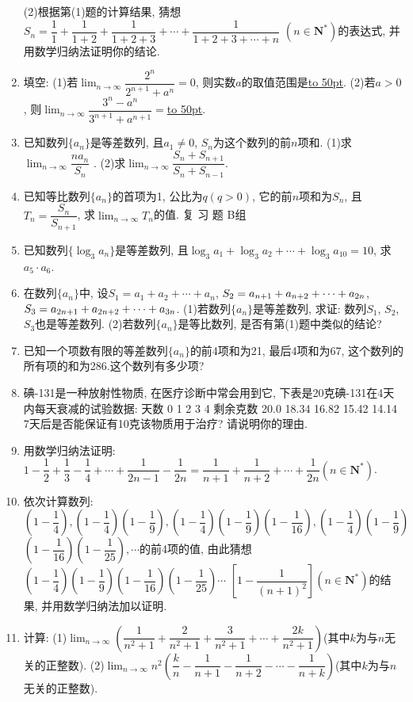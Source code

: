 \documentclass[10pt,a4paper]{article}
\newcommand{\blank}[1]{\underline{\hbox to #1pt{}}}
\begin{document}
\begin{enumerate}[1.]
(2)根据第(1)题的计算结果, 猜想$S_n=\dfrac 11+\dfrac 1{1+2}+\dfrac 1{1+2+3}+\cdots +\dfrac 1{1+2+3+\cdots +n}$ $(n\in \mathbf{N}^*)$的表达式, 并用数学归纳法证明你的结论.
\item 填空:
(1)若$\displaystyle\lim_{n\to\infty}\dfrac{2^n}{{2^{n+1}}+{a^n}}=0$, 则实数$a$的取值范围是\blank{50}.
(2)若$a>0$, 则$\displaystyle\lim_{n\to\infty}\dfrac{{3^n}-{a^n}}{{3^{n+1}}+{a^{n+1}}}=$\blank{50}.
\item 已知数列$\{a_n\}$是等差数列, 且$a_1\ne 0$, $S_n$为这个数列的前$n$项和.
(1)求$\displaystyle\lim_{n\to\infty}\dfrac{n{a_n}}{S_n}$ .
(2)求$\displaystyle\lim_{n\to\infty}\dfrac{{S_n}+{S_{n+1}}}{{S_n}+{S_{n-1}}}$.
\item 已知等比数列$\{a_n\}$的首项为1, 公比为$q(q>0)$, 它的前$n$项和为$S_n$, 且$T_n=\dfrac{S_n}{{S_{n+1}}}$, 求$\displaystyle\lim_{n\to\infty}T_n$的值.
复 习 题
B组
\item 已知数列$\{\log _3a_n\}$是等差数列, 且$\log _3a_1+\log _3a_2+\cdots +\log _3a_{10}=10$, 求$a_5\cdot a_6$.
\item 在数列$\{a_n\}$中, 设$S_1=a_1+a_2+\cdots +a_n$, $S_{\text2}=a_{n+1}+a_{n+2}+\cdots +a_{2n}$, $S_{\text3}=a_{2n+1}+a_{2n+2}+\cdots +a_{3n}$.
(1)若数列$\{a_n\}$是等差数列, 求证: 数列$S_1$, $S_2$, $S_3$也是等差数列.
(2)若数列$\{a_n\}$是等比数列, 是否有第(1)题中类似的结论?
\item 已知一个项数有限的等差数列$\{a_n\}$的前4项和为21, 最后4项和为67, 这个数列的所有项的和为286.这个数列有多少项?
\item 碘-131是一种放射性物质, 在医疗诊断中常会用到它, 下表是20克碘-131在4天内每天衰减的试验数据:
天数	0	1	2	3	4
剩余克数	20.0	18.34	16.82	15.42	14.14
7天后是否能保证有10克该物质用于治疗? 请说明你的理由.
\item 用数学归纳法证明:
$1-\dfrac 12+\dfrac 13-\dfrac 14+\cdots +\dfrac 1{2n-1}-\dfrac 1{2n}=\dfrac 1{n+1}+\dfrac 1{n+2}+\cdots +\dfrac 1{2n}(n\in \mathbf{N}^*)$.
\item 依次计算数列: $(1-\dfrac 14),(1-\dfrac 14)(1-\dfrac 19),(1-\dfrac 14)(1-\dfrac 19)(1-\dfrac 1{16}),(1-\dfrac 14)(1-\dfrac 19)$ $(1-\dfrac 1{16})(1-\dfrac 1{25}),\cdots$的前4项的值, 由此猜想$(1-\dfrac 14)(1-\dfrac 19)(1-\dfrac 1{16})(1-\dfrac 1{25})\cdots$ $[1-\dfrac 1{(n+1)^2}](n\in \mathbf{N}^*)$的结果, 并用数学归纳法加以证明.
\item 计算:
(1)$\displaystyle\lim_{n\to\infty}(\dfrac 1{n^2+1}+\dfrac 2{n^2+1}+\dfrac 3{n^2+1}+\cdots +\dfrac{2k}{{n^2}+1})$(其中$k$为与$n$无关的正整数).
(2)$\displaystyle\lim_{n\to\infty}n^2(\dfrac kn-\dfrac 1{n+1}-\dfrac 1{n+2}-\cdots -\dfrac 1{n+k})$(其中$k$为与$n$无关的正整数).

\end{enumerate}
\end{document}
